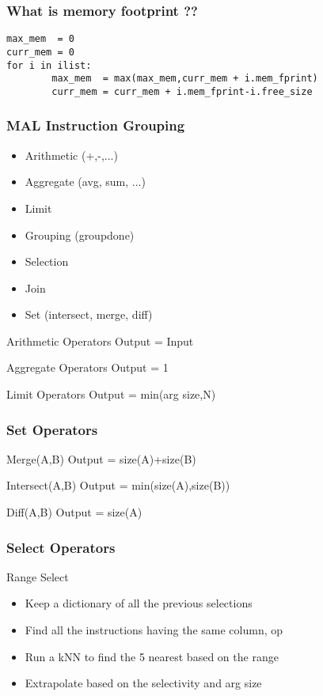 \begin{frame}[fragile]
\frametitle{What is memory footprint ??}
\begin{lstlisting}
max_mem  = 0
curr_mem = 0
for i in ilist:
		max_mem  = max(max_mem,curr_mem + i.mem_fprint)
		curr_mem = curr_mem + i.mem_fprint-i.free_size

\end{lstlisting}
\end{frame}

\begin{frame}[fragile]
\frametitle{MAL Instruction Grouping}
\begin{itemize}
\item Arithmetic (+,-,...)
\item Aggregate (avg, sum, ...)
\item Limit
\item Grouping (groupdone)
\item Selection
\item Join
\item Set (intersect, merge, diff)
\end{itemize}
\end{frame}

\begin{frame}
\begin{block}{Arithmetic Operators}
Output = Input
\end{block}
\begin{block}{Aggregate Operators}
Output = 1
\end{block}
\begin{block}{Limit Operators}
Output = min(arg size,N)
\end{block}
\end{frame}

\begin{frame}
\frametitle{Set Operators}
\begin{block}{Merge(A,B)}
Output = size(A)+size(B)
\end{block}
\begin{block}{Intersect(A,B)}
Output = min(size(A),size(B))
\end{block}
\begin{block}{Diff(A,B)}
Output = size(A)
\end{block}
\end{frame}

\begin{frame}
\frametitle{Select Operators}
\begin{block}{Range Select}
\begin{itemize}
\item Keep a dictionary of all the previous selections
\item Find all the instructions having the same column, op
\item Run a kNN to find the 5 nearest based on the range
\item Extrapolate based on the selectivity and arg size
\end{itemize}
\end{block}
\end{frame}

